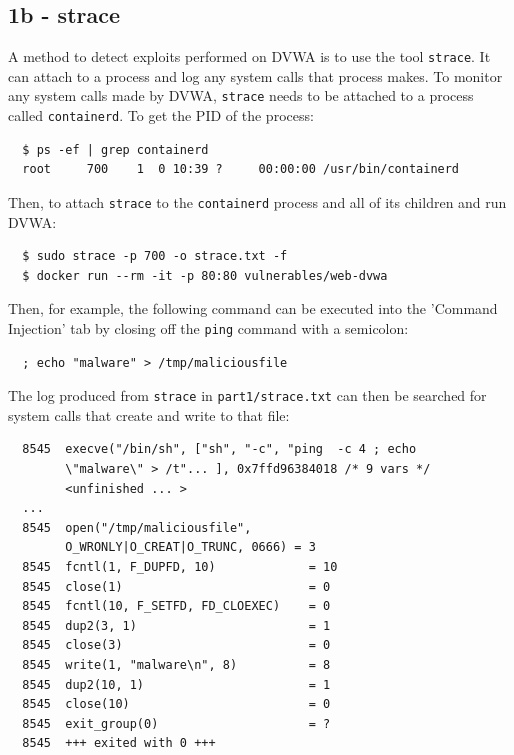\documentclass[11pt]{article}
\begin{document}
\subsection*{1b - strace}
A method to detect exploits performed on DVWA is to use the tool \verb|strace|. It can attach to a process and log any system calls
that process makes. To monitor any system calls made by DVWA, \verb|strace| needs to be attached to a process called
\verb|containerd|. To get the PID of the process:
\begin{verbatim}
  $ ps -ef | grep containerd
  root     700    1  0 10:39 ?     00:00:00 /usr/bin/containerd
\end{verbatim}
Then, to attach \verb|strace| to the \verb|containerd| process and all of its children and run DVWA:
\begin{verbatim}
  $ sudo strace -p 700 -o strace.txt -f
  $ docker run --rm -it -p 80:80 vulnerables/web-dvwa
\end{verbatim}
Then, for example, the following command can be executed into the 'Command Injection' tab by closing off the \verb|ping| command with
a semicolon:
\begin{verbatim}
  ; echo "malware" > /tmp/maliciousfile
\end{verbatim}
The log produced from \verb|strace| in \verb|part1/strace.txt| can then be searched for system calls that create and write to 
that file:
\begin{verbatim}
  8545  execve("/bin/sh", ["sh", "-c", "ping  -c 4 ; echo
        \"malware\" > /t"... ], 0x7ffd96384018 /* 9 vars */
        <unfinished ... >
  ...
  8545  open("/tmp/maliciousfile",
        O_WRONLY|O_CREAT|O_TRUNC, 0666) = 3
  8545  fcntl(1, F_DUPFD, 10)             = 10
  8545  close(1)                          = 0
  8545  fcntl(10, F_SETFD, FD_CLOEXEC)    = 0
  8545  dup2(3, 1)                        = 1
  8545  close(3)                          = 0
  8545  write(1, "malware\n", 8)          = 8
  8545  dup2(10, 1)                       = 1
  8545  close(10)                         = 0
  8545  exit_group(0)                     = ?
  8545  +++ exited with 0 +++
\end{verbatim}
\end{document}
